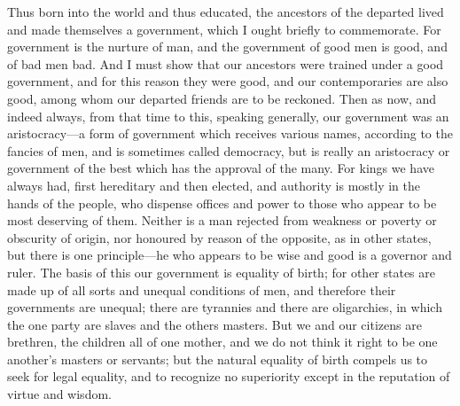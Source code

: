 \documentclass[11pt,letter]{article}
\begin{document}
\par  Thus born into the world and thus educated, the ancestors of the departed lived and made themselves a government, which I ought briefly to commemorate. For government is the nurture of man, and the government of good men is good, and of bad men bad. And I must show that our ancestors were trained under a good government, and for this reason they were good, and our contemporaries are also good, among whom our departed friends are to be reckoned. Then as now, and indeed always, from that time to this, speaking generally, our government was an aristocracy—a form of government which receives various names, according to the fancies of men, and is sometimes called democracy, but is really an aristocracy or government of the best which has the approval of the many. For kings we have always had, first hereditary and then elected, and authority is mostly in the hands of the people, who dispense offices and power to those who appear to be most deserving of them. Neither is a man rejected from weakness or poverty or obscurity of origin, nor honoured by reason of the opposite, as in other states, but there is one principle—he who appears to be wise and good is a governor and ruler. The basis of this our government is equality of birth; for other states are made up of all sorts and unequal conditions of men, and therefore their governments are unequal; there are tyrannies and there are oligarchies, in which the one party are slaves and the others masters. But we and our citizens are brethren, the children all of one mother, and we do not think it right to be one another's masters or servants; but the natural equality of birth compels us to seek for legal equality, and to recognize no superiority except in the reputation of virtue and wisdom.
\end{document}
